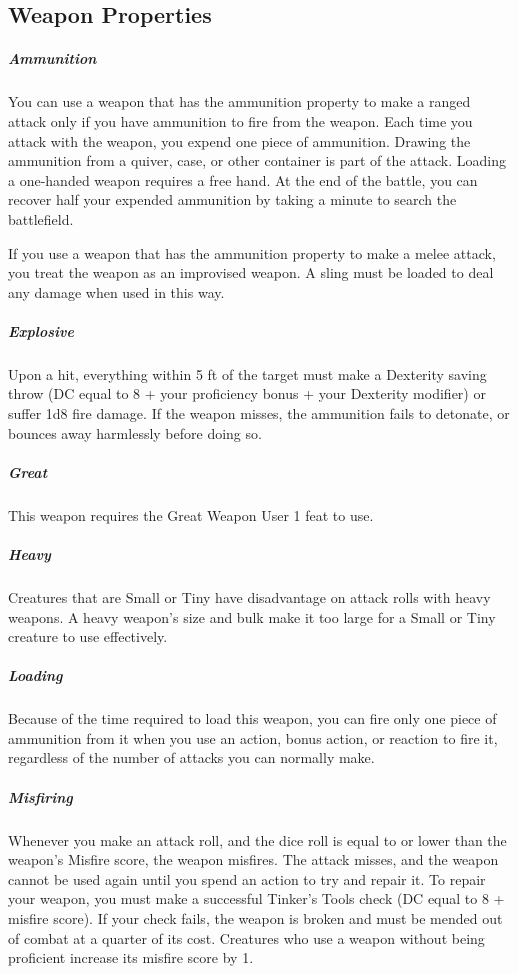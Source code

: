 
\subsection*{Weapon Properties}
\subparagraph{Ammunition} You can use a weapon that has the ammunition property to make a ranged attack only if you have ammunition to fire from the weapon.
Each time you attack with the weapon, you expend one piece of ammunition.
Drawing the ammunition from a quiver, case, or other container is part of the attack.
Loading a one-handed weapon requires a free hand.
At the end of the battle, you can recover half your expended ammunition by taking a minute to search the battlefield.

If you use a weapon that has the ammunition property to make a melee attack, you treat the weapon as an improvised weapon.
A sling must be loaded to deal any damage when used in this way.

\subparagraph{Explosive} Upon a hit, everything within 5 ft of the target must make a Dexterity saving throw (DC equal to 8 + your proficiency bonus + your Dexterity modifier) or suffer 1d8 fire damage.
If the weapon misses, the ammunition fails to detonate, or bounces away harmlessly before doing so.

\subparagraph{Great} This weapon requires the Great Weapon User 1 feat to use.

\subparagraph{Heavy} Creatures that are Small or Tiny have disadvantage on attack rolls with heavy weapons.
A heavy weapon's size and bulk make it too large for a Small or Tiny creature to use effectively.

\subparagraph{Loading} Because of the time required to load this weapon, you can fire only one piece of ammunition from it when you use an action, bonus action, or reaction to fire it, regardless of the number of attacks you can normally make.

\subparagraph{Misfiring} Whenever you make an attack roll, and the dice roll is equal to or lower than the weapon’s Misfire score, the weapon misfires.
The attack misses, and the weapon cannot be used again until you spend an action to try and repair it.
To repair your weapon, you must make a successful Tinker’s Tools check (DC equal to 8 + misfire score).
If your check fails, the weapon is broken and must be mended out of combat at a quarter of its cost.
Creatures who use a weapon without being proficient increase its misfire score by 1.

